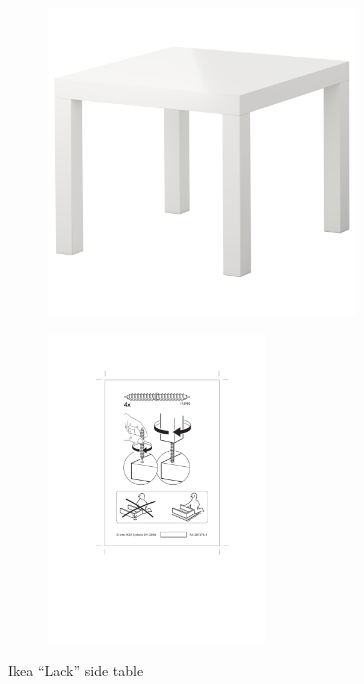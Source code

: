 \documentclass[12pt,letterpaper]{ntdhw}
\begin{document}
\begin{figure}
  \begin{subfigure}{.5\textwidth}
    \centering
    \includegraphics[height=22em]{ikea/lack.jpg}
    \caption{}
    \label{fig:lack}
  \end{subfigure}
  \hfil
  \begin{subfigure}{.5\textwidth}
    \centering
    \includegraphics[height=22em,clip,trim={2.25in 4in 2.25in 2in}]{ikea/lack-instr.pdf}
    \caption{}
    \label{fig:instr}
  \end{subfigure}
  \caption{Ikea ``Lack'' side table}
  \label{fig:sokoban}
\end{figure}
\end{document}

